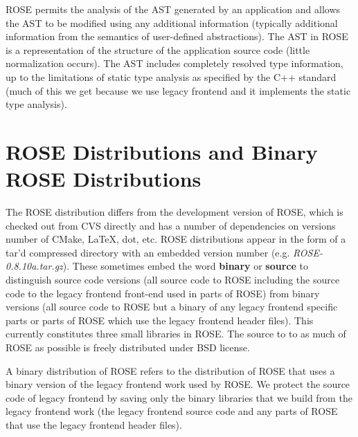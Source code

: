    ROSE permits the analysis of the AST generated by an application and allows the AST to
be modified using any additional information (typically additional information from the
semantics of user-defined abstractions). The AST in ROSE is a representation of the 
structure of the application source code (little normalization occurs). The AST includes
completely resolved type information, up to the limitations of static type analysis as
specified by the C++ standard (much of this we get because we use legacy frontend and it implements
the static type analysis).


\section{ROSE Distributions and Binary ROSE Distributions}

   The ROSE distribution differs from the development version of ROSE, which
is checked out from CVS directly and has a number of dependencies on versions
number of CMake, LaTeX, dot, etc.  ROSE distributions appear in
the form of a tar'd compressed directory with an embedded version number 
(e.g. {\it ROSE-0.8.10a.tar.gz}). These sometimes embed the word {\bf binary} or {\bf source}
to distinguish source code versions (all source code to ROSE including the source code 
to the legacy frontend front-end used in parts of ROSE) from binary versions (all source code to ROSE
but a binary of any legacy frontend specific parts or parts of ROSE which use the legacy frontend header files).
This currently constitutes three small libraries in ROSE.  The source to to as much of
ROSE as possible is freely distributed under BSD license.

   A binary distribution of ROSE refers to the distribution of ROSE that uses a binary
version of the legacy frontend work used by ROSE.  We protect the source code of legacy frontend by saving only 
the binary libraries that we build from the legacy frontend work (the legacy frontend source code and any parts 
of ROSE that use the legacy frontend header files).  
